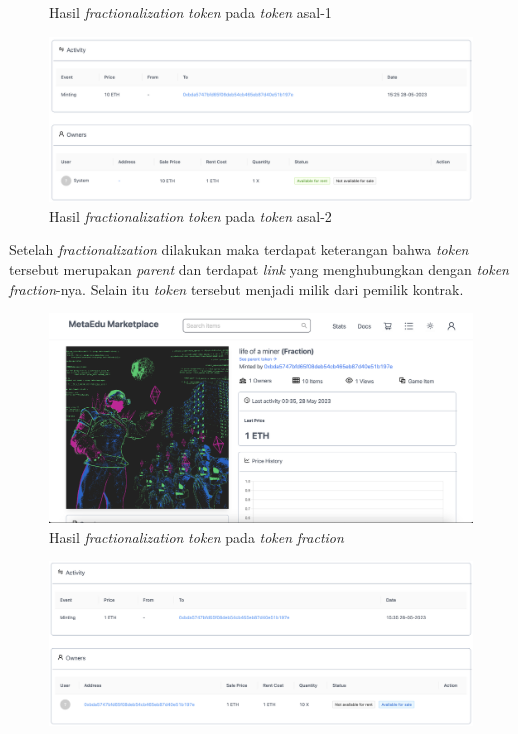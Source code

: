 \begin{itemize}
\begin{figure} [H]
            \caption{Hasil \emph{fractionalization} \emph{token} pada \emph{token} asal-1}
            \label{fig:TestShareResultFractionalizationTokenOnParent1}
        \end{figure}
        \begin{figure} [H] \centering
            \includegraphics[scale=0.3]{gambar/img-test-share-fraction-4.png}
            \caption{Hasil \emph{fractionalization} \emph{token} pada \emph{token} asal-2}
            \label{fig:TestShareResultFractionalizationTokenOnParent2}
        \end{figure}
        Setelah \emph{fractionalization} dilakukan maka terdapat keterangan bahwa \emph{token} tersebut merupakan \emph{parent} dan terdapat \emph{link} yang menghubungkan dengan \emph{token} \emph{fraction}-nya. Selain itu \emph{token} tersebut menjadi milik dari pemilik kontrak.
        \begin{figure} [H] \centering
          \includegraphics[scale=0.3]{gambar/img-test-share-fraction-5.png}
          \caption{Hasil \emph{fractionalization} \emph{token} pada \emph{token} \emph{fraction}}
          \label{fig:TestShareResultFractionalizationTokenOnFraction1}
        \end{figure}
        \begin{figure} [H] \centering
          \includegraphics[scale=0.3]{gambar/img-test-share-fraction-6.png}

\end{figure}
\end{itemize}
